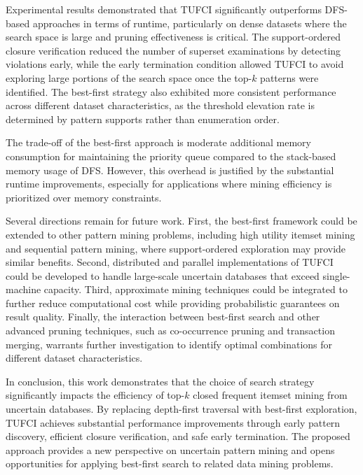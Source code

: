 \documentclass[10pt,letterpaper]{article}
\begin{document}
Experimental results demonstrated that TUFCI significantly outperforms DFS-based approaches in terms of runtime, particularly on dense datasets where the search space is large and pruning effectiveness is critical. The support-ordered closure verification reduced the number of superset examinations by detecting violations early, while the early termination condition allowed TUFCI to avoid exploring large portions of the search space once the top-$k$ patterns were identified. The best-first strategy also exhibited more consistent performance across different dataset characteristics, as the threshold elevation rate is determined by pattern supports rather than enumeration order.

The trade-off of the best-first approach is moderate additional memory consumption for maintaining the priority queue compared to the stack-based memory usage of DFS. However, this overhead is justified by the substantial runtime improvements, especially for applications where mining efficiency is prioritized over memory constraints.

Several directions remain for future work. First, the best-first framework could be extended to other pattern mining problems, including high utility itemset mining and sequential pattern mining, where support-ordered exploration may provide similar benefits. Second, distributed and parallel implementations of TUFCI could be developed to handle large-scale uncertain databases that exceed single-machine capacity. Third, approximate mining techniques could be integrated to further reduce computational cost while providing probabilistic guarantees on result quality. Finally, the interaction between best-first search and other advanced pruning techniques, such as co-occurrence pruning and transaction merging, warrants further investigation to identify optimal combinations for different dataset characteristics.

In conclusion, this work demonstrates that the choice of search strategy significantly impacts the efficiency of top-$k$ closed frequent itemset mining from uncertain databases. By replacing depth-first traversal with best-first exploration, TUFCI achieves substantial performance improvements through early pattern discovery, efficient closure verification, and safe early termination. The proposed approach provides a new perspective on uncertain pattern mining and opens opportunities for applying best-first search to related data mining problems.
\pagebreak

\end{document}
